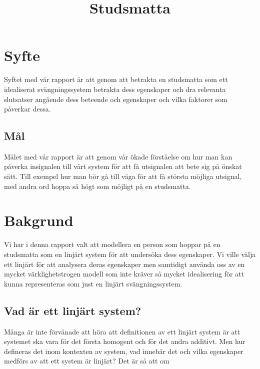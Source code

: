 \documentclass[10pt,a4paper]{article}
\begin{document}

\title{Studsmatta}
\maketitle

\cleardoublepage

\tableofcontents

\clearpage

\section{Syfte}
\setcounter{page}{3}

Syftet med vår rapport är att genom att betrakta en studsmatta som ett idealiserat svängningssystem betrakta dess egenskaper och dra relevanta slutsatser angående dess beteende och egenskaper och vilka faktorer som påverkar dessa.

\subsection{Mål}

Målet med vår rapport är att genom vår ökade förståelse om hur man kan påverka insignalen till vårt system för att få utsignalen att bete sig på önskat sätt. Till exempel hur man bör gå till väga för att få största möjliga utsignal, med andra ord hoppa så högt som möjligt på en studsmatta.

\section{Bakgrund}

Vi har i denna rapport valt att modellera en person som hoppar på en studsmatta som en linjärt system för att undersöka dess egenskaper. Vi ville välja ett linjärt för att analysera deras egenskaper men samtidigt använda oss av en mycket värklighetstrogen modell som inte kräver så mycket idealisering för att kunna representeras som just en linjärt svängningssystem.

\subsection{Vad är ett linjärt system?}

Många är inte förvånade att höra att definitionen av ett linjärt system är att systemet ska vara för det första homogent och för det andra additivt. Men hur defineras det inom kontexten av system, vad innebär det och vilka egenskaper medförs av att ett system är linjärt? Det är så att om
\end{document}
